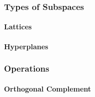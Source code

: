 


\subsubsection{Types of Subspaces}

\paragraph{Lattices}



\paragraph{Hyperplanes}


\subsubsection{Operations}






\paragraph{Orthogonal Complement}




